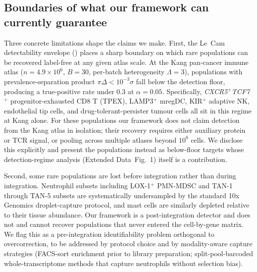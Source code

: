 
\subsection{Boundaries of what our framework can currently guarantee}
\label{sec:discussion-limitations-immunology}

Three concrete limitations shape the claims we make. First, the Le~Cam
detectability envelope () places a
sharp boundary on which rare populations can be recovered label-free
at any given atlas scale. At the Kang pan-cancer immune atlas
($n = 4.9 \times 10^6$, $B = 30$, per-batch heterogeneity
$\Lambda = 3$), populations with prevalence-separation product
$\pi\Delta < 10^{-3}\sigma$ fall below the detection floor, producing
a true-positive rate under 0.3 at $\alpha = 0.05$. Specifically,
\textit{CXCR5}$^+$\textit{TCF7}$^+$ progenitor-exhausted CD8 T
(TPEX), LAMP3$^+$ mregDC, KIR$^+$ adaptive NK, endothelial tip
cells, and drug-tolerant-persister tumour cells all sit in this
regime at Kang alone. For these populations our framework does not
claim detection from the Kang atlas in isolation; their recovery
requires either auxiliary protein or TCR signal, or pooling across
multiple atlases beyond $10^8$ cells. We disclose this explicitly
and present the populations instead as below-floor targets whose
detection-regime analysis (Extended Data~Fig.~1) itself is a
contribution.

Second, some rare populations are lost before integration rather than
during integration. Neutrophil subsets including LOX-1$^+$
PMN-MDSC and TAN-1 through TAN-5 subsets are systematically
undersampled by the standard 10x Genomics droplet-capture protocol,
and mast cells are similarly depleted relative to their tissue
abundance. Our framework is a post-integration detector and does not
and cannot recover populations that never entered the cell-by-gene
matrix. We flag this as a pre-integration identifiability problem
orthogonal to overcorrection, to be addressed by protocol choice
and by modality-aware capture strategies (FACS-sort enrichment prior
to library preparation; split-pool-barcoded whole-transcriptome
methods that capture neutrophils without selection bias).

